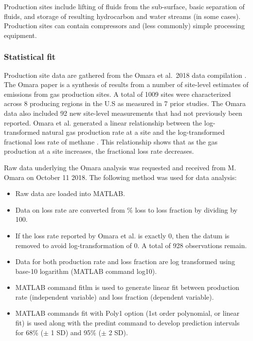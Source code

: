 \documentclass[11pt]{report}
\newcommand{\prm}[1]{\textsf{#1}}
\begin{document}
{{{{Production sites include lifting of fluids from the sub-surface, basic separation of fluids, and storage of resulting hydrocarbon and water streams (in some cases). Production sites can contain compressors and (less commonly) simple processing equipment.

\subsubsection{Statistical fit}

Production site data are gathered from the Omara et al.\ 2018 data compilation \cite{Omara2018}. The Omara paper is a synthesis of results from a number of site-level estimates of emissions from gas production sites. A total of 1009 sites were characterized across 8 producing regions in the U.S as measured in 7 prior studies. The Omara data also included 92 new site-level measurements that had not previously been reported. Omara et al. generated a linear relationship between the log-transformed natural gas production rate at a site and the log-transformed fractional loss rate of methane \cite[Figure 3]{Omara2018}. This relationship shows that as the gas production at a site increases, the fractional loss rate decreases.

Raw data underlying the Omara analysis was requested and received from M. Omara on October 11 2018. The following method was used for data analysis:
\begin{itemize}
\item Raw data are loaded into MATLAB.
\item Data on loss rate are converted from \% loss to loss fraction by dividing by 100.
\item If the loss rate reported by Omara et al. is exactly 0, then the datum is removed to avoid log-transformation of 0. A total of 928 observations remain. 
\item Data for both production rate and loss fraction are log transformed using base-10 logarithm (MATLAB command \prm{log10}).
\item MATLAB command \prm{fitlm} is used to generate linear fit between production rate (independent variable) and loss fraction (dependent variable). 
\item MATLAB commands \prm{fit} with \prm{Poly1} option (1st order polynomial, or linear fit) is used along with the \prm{predint} command to develop prediction intervals for 68\% ($\pm$ 1 SD) and 95\% ($\pm$ 2 SD).
\end{itemize} 

}}}}
\end{document}
